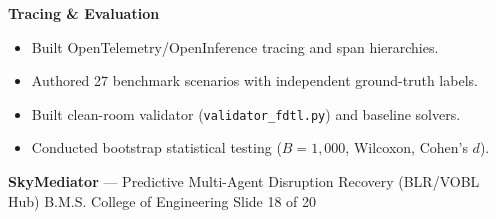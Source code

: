 \documentclass[11pt]{article}
\newcommand{\slidefooter}[1]{%
  \vfill
  \noindent{\color{BorderGray}\hrule height 0.8pt}\vspace{0.04in}
  \noindent\begin{minipage}{\textwidth}
    {\footnotesize\color{SlateGray}\textbf{SkyMediator} --- Predictive Multi-Agent Disruption Recovery (BLR/VOBL Hub) \hfill B.M.S. College of Engineering \hfill Slide #1 of 20}
  \end{minipage}
}
\begin{document}
\begin{minipage}[t][5.35in][t]{\textwidth}
\begin{minipage}[t]{0.31\textwidth}
{{\textbf{\footnotesize Tracing \& Evaluation}\\[0.4em]
\begin{itemize}\scriptsize
  \item Built OpenTelemetry/OpenInference tracing and span hierarchies.
  \item Authored 27 benchmark scenarios with independent ground-truth labels.
  \item Built clean-room validator (\texttt{validator\_fdtl.py}) and baseline solvers.
  \item Conducted bootstrap statistical testing ($B=1,000$, Wilcoxon, Cohen's $d$).
\end{itemize}
}%
}
\end{minipage}
\slidefooter{18}
\end{minipage}
\clearpage
\end{document}
